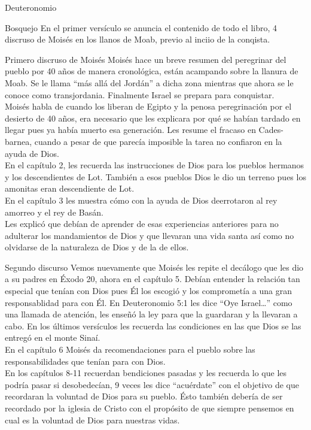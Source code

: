 \begin{section}{Deuteronomio}
	\begin{subsection}{Bosquejo}
		En el primer versículo se anuncia el contenido de todo el libro, 4 discruso de Moisés en los llanos de Moab, previo al inciio de la conqista.
		\begin{subsubsection}{Primero discruso de Moisés}
			Moisés hace un breve resumen del peregrinar del pueblo por 40 años de manera cronológica, están acampando sobre la llanura de Moab. Se le llama ``más allá del Jordán'' a dicha zona mientras que ahora se le conoce como transjordania. Finalmente Israel se prepara para conquistar.\\
			Moisés habla de cuando los liberan de Egipto y la penosa peregrinación por el desierto de 40 años, era necesario que les explicara por qué se habían tardado en llegar pues ya había muerto esa generación. Les resume el fracaso en Cades-barnea, cuando a pesar de que parecía imposible la tarea no confiaron en la ayuda de Dios.\\
			En el capítulo 2, les recuerda las instrucciones de Dios para los pueblos hermanos y los descendientes de Lot. También a esos pueblos Dios le dio un terreno pues los amonitas eran descendiente de Lot.\\
			 En el capítulo 3 les muestra cómo con la ayuda de Dios deerrotaron al rey amorreo y el rey de Basán.\\
			 Les explicó que debían de aprender de esas experiencias anteriores para no adulterar los mandamientos de Dios y que llevaran una vida santa así como no olvidarse de la naturaleza de Dios y de la de ellos.
		 \end{subsubsection}
	\end{subsection}
	\begin{subsubsection}{Segundo discurso}
		Vemos nuevamente que Moisés les repite el decálogo que les dio a su padres en Éxodo 20, ahora en el capítulo 5. Debían entender la relación tan especial que tenían con Dios pues Él los escogió y los comprometía a una gran responsablidad para con Él. En Deuteronomio 5:1 les dice ``Oye Israel\ldots'' como una llamada de atención, les enseñó la ley para que la guardaran y la llevaran a cabo. En los últimos versículos les recuerda las condiciones en las que Dios se las entregó en el monte Sinaí.\\
		En el capítulo 6 Moisés da recomendaciones para el pueblo sobre las responsabilidades que tenían para con Dios.\\
		En los capítulos 8-11 recuerdan bendiciones pasadas y les recuerda lo que les podría pasar si desobedecían, 9 veces les dice ``acuérdate'' con el objetivo de que recordaran la voluntad de Dios para su pueblo. Ésto también debería de ser recordado por la iglesia de Cristo con el propósito de que siempre pensemos en cual es la voluntad de Dios para nuestras vidas.\\

\end{subsubsection}
\end{section}
